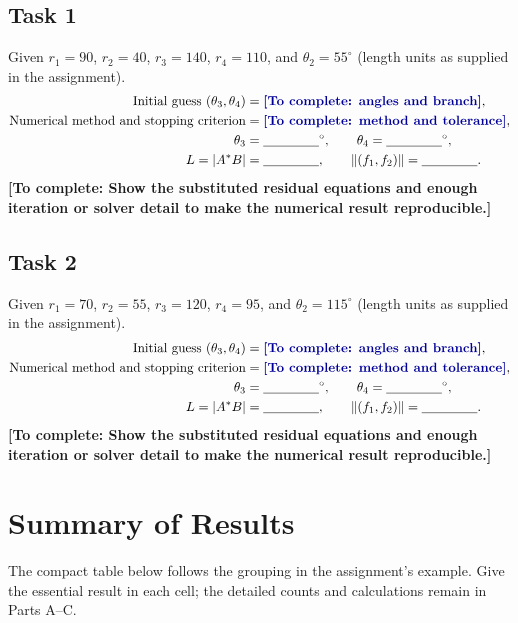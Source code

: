 \documentclass[11pt,a4paper]{article}
\newcommand{\prompt}[1]{\textcolor{blue!60!black}{\textbf{[To complete: #1]}}}
\newcommand{\blank}{\underline{\hspace{1.5cm}}}
\begin{document}
\subsection{Task 1}
Given $r_1=90$, $r_2=40$, $r_3=140$, $r_4=110$, and
$\theta_2=55^\circ$ (length units as supplied in the assignment).
\begin{align*}
  \text{Initial guess }(\theta_3,\theta_4)&=\prompt{angles and branch},\\
  \text{Numerical method and stopping criterion}&=\prompt{method and tolerance},\\
  \theta_3&=\blank^\circ,\qquad \theta_4=\blank^\circ,\\
  L=|A^*B|&=\blank,\qquad \lVert(f_1,f_2)\rVert=\blank.
\end{align*}
\prompt{Show the substituted residual equations and enough iteration or
solver detail to make the numerical result reproducible.}

\subsection{Task 2}
Given $r_1=70$, $r_2=55$, $r_3=120$, $r_4=95$, and
$\theta_2=115^\circ$ (length units as supplied in the assignment).
\begin{align*}
  \text{Initial guess }(\theta_3,\theta_4)&=\prompt{angles and branch},\\
  \text{Numerical method and stopping criterion}&=\prompt{method and tolerance},\\
  \theta_3&=\blank^\circ,\qquad \theta_4=\blank^\circ,\\
  L=|A^*B|&=\blank,\qquad \lVert(f_1,f_2)\rVert=\blank.
\end{align*}
\prompt{Show the substituted residual equations and enough iteration or
solver detail to make the numerical result reproducible.}

\clearpage
\section{Summary of Results}
The compact table below follows the grouping in the assignment's example.
Give the essential result in each cell; the detailed counts and calculations
remain in Parts A--C.
\end{document}
